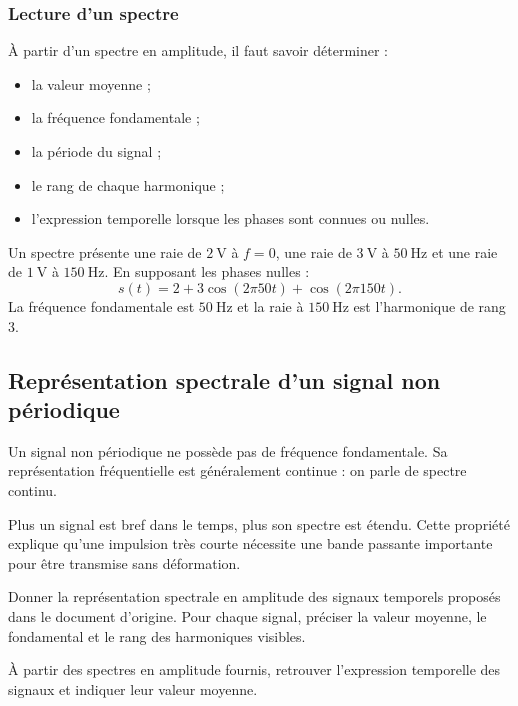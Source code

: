 \subsubsection{Lecture d'un spectre}

À partir d'un spectre en amplitude, il faut savoir déterminer :
\begin{itemize}
  \item la valeur moyenne ;
  \item la fréquence fondamentale ;
  \item la période du signal ;
  \item le rang de chaque harmonique ;
  \item l'expression temporelle lorsque les phases sont connues ou nulles.
\end{itemize}

\begin{exemple}
Un spectre présente une raie de $\SI{2}{\volt}$ à $f=0$, une raie de $\SI{3}{\volt}$ à $\SI{50}{\hertz}$ et une raie de $\SI{1}{\volt}$ à $\SI{150}{\hertz}$. En supposant les phases nulles :
\[
s(t)=2+3\cos(2\pi 50t)+\cos(2\pi 150t).
\]
La fréquence fondamentale est $\SI{50}{\hertz}$ et la raie à $\SI{150}{\hertz}$ est l'harmonique de rang 3.
\end{exemple}

\subsection{Représentation spectrale d'un signal non périodique}

Un signal non périodique ne possède pas de fréquence fondamentale. Sa représentation fréquentielle est généralement continue : on parle de spectre continu.

Plus un signal est bref dans le temps, plus son spectre est étendu. Cette propriété explique qu'une impulsion très courte nécessite une bande passante importante pour être transmise sans déformation.

\begin{application}
Donner la représentation spectrale en amplitude des signaux temporels proposés dans le document d'origine. Pour chaque signal, préciser la valeur moyenne, le fondamental et le rang des harmoniques visibles.
\end{application}

\begin{application}
À partir des spectres en amplitude fournis, retrouver l'expression temporelle des signaux et indiquer leur valeur moyenne.
\end{application}

